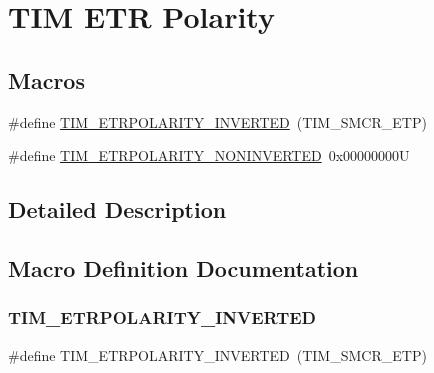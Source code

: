 \hypertarget{group___t_i_m___e_t_r___polarity}{}\section{T\+IM E\+TR Polarity}
\label{group___t_i_m___e_t_r___polarity}
\subsection*{Macros}
\begin{DoxyCompactItemize}
\item 
\#define \hyperlink{group___t_i_m___e_t_r___polarity_ga42652ff688f0042659f8304ae08abfa6}{T\+I\+M\+\_\+\+E\+T\+R\+P\+O\+L\+A\+R\+I\+T\+Y\+\_\+\+I\+N\+V\+E\+R\+T\+ED}~(T\+I\+M\+\_\+\+S\+M\+C\+R\+\_\+\+E\+TP)
\item 
\#define \hyperlink{group___t_i_m___e_t_r___polarity_ga7fa7c43245b25564414b2e191d5d8b14}{T\+I\+M\+\_\+\+E\+T\+R\+P\+O\+L\+A\+R\+I\+T\+Y\+\_\+\+N\+O\+N\+I\+N\+V\+E\+R\+T\+ED}~0x00000000U
\end{DoxyCompactItemize}


\subsection{Detailed Description}


\subsection{Macro Definition Documentation}
\mbox{\label{group___t_i_m___e_t_r___polarity_ga42652ff688f0042659f8304ae08abfa6}} 
\subsubsection{\texorpdfstring{T\+I\+M\+\_\+\+E\+T\+R\+P\+O\+L\+A\+R\+I\+T\+Y\+\_\+\+I\+N\+V\+E\+R\+T\+ED}{TIM\_ETRPOLARITY\_INVERTED}}
{\footnotesize\ttfamily \#define T\+I\+M\+\_\+\+E\+T\+R\+P\+O\+L\+A\+R\+I\+T\+Y\+\_\+\+I\+N\+V\+E\+R\+T\+ED~(T\+I\+M\+\_\+\+S\+M\+C\+R\+\_\+\+E\+TP)}

